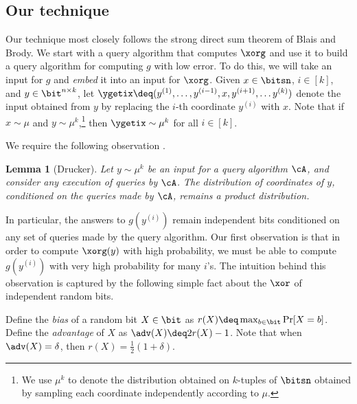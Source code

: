 \documentclass[11pt]{article}
\numberwithin{equation}{section}
\newtheorem{lemma}[theorem]{Lemma}
\theoremstyle{definition}
\theoremstyle{plain}
\begin{document}
\subsection{Our technique}    %
Our technique most closely follows the
strong direct sum theorem of Blais and Brody.  We start with a query
algorithm that computes $\xorg$ and use it to build a query algorithm
for computing $g$ with low error.  To do this, %
we will %
take an input for
$g$ and \emph{embed} it into an input for $\xorg$.  Given
$x \in \bitsn$, $i \in [k]$, and $y \in \bit^{n\times k}$, let
$\ygetix \deq (y^{(1)}, \ldots, y^{(i-1)}, x, y^{(i+1)}, \ldots
y^{(k)})$ denote the input obtained from $y$ by replacing the $i$-th
coordinate $y^{(i)}$ with $x$.  Note that if $x \sim \mu$ and
$y \sim \mu^k$,\footnote{We use $\mu^k$ to denote the distribution
  obtained on $k$-tuples of $\bitsn$ obtained by sampling each
  coordinate independently according to $\mu$.} then
$\ygetix\sim \mu^k$ for all $i \in [k]$.

We require the following observation %
\cite[Lemma 3.2]{Drucker12}.
\begin{lemma}[Drucker]
  Let $y\sim \mu^k$ be an input for a query algorithm $\cA$, and
  consider any execution of queries by $\cA$.  The distribution of
  coordinates of $y$, conditioned on the queries made by $\cA$,
  remains a product distribution.
\end{lemma}

In particular, the answers to $g(y^{(i)})$ remain independent bits
conditioned on any set of queries made by the query algorithm.
Our first observation is that in order to compute $\xorg(y)$ with high
probability, we must be able to compute $g(y^{(i)})$ with very high
probability for many $i$'s.  The intuition behind this observation is
captured by the following simple fact about the $\xor$ of independent
random bits.

Define the \emph{bias} of a random bit $X \in \bit$ as
$r(X) \deq \max_{b\in\bit}\Pr[X=b]$.  Define the \emph{advantage} of
$X$ as $\adv(X) \deq 2r(X)-1$.  Note that when $\adv(X) = \delta$,
then $r(X) = \frac{1}{2}(1+\delta)$.
\end{document}
